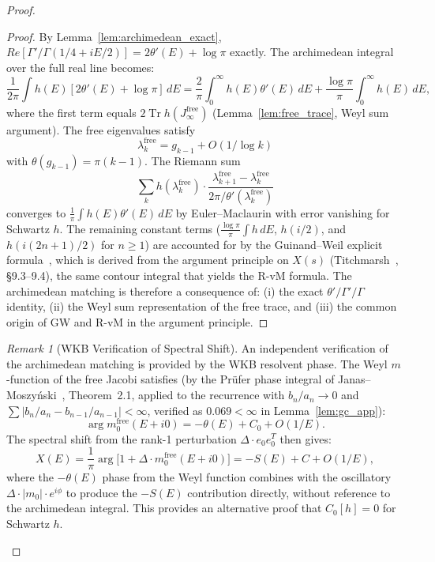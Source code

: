 \documentclass{pre-aomart}
\def\Re{Re}%
\def\xi{X}%
\theoremstyle{plain}
\theoremstyle{definition}
\theoremstyle{remark}
\newtheorem{remark}[theorem]{Remark}
\begin{document}
\begin{proof}
\begin{proof}
By Lemma~\ref{lem:archimedean_exact},
$\Re[\Gamma'/\Gamma(1/4+iE/2)] = 2\theta'(E) + \log\pi$ exactly.
The archimedean integral over the full real line becomes:
\[
\frac{1}{2\pi}\int h(E)[2\theta'(E)+\log\pi]\,dE
= \frac{2}{\pi}\int_0^\infty h(E)\theta'(E)\,dE
  + \frac{\log\pi}{\pi}\int_0^\infty h(E)\,dE,
\]
where the first term equals $2\operatorname{Tr}h(J_\infty^{\mathrm{free}})$
(Lemma~\ref{lem:free_trace}, Weyl sum argument).  The free
eigenvalues satisfy
\[
\lambda_k^{\mathrm{free}} = g_{k-1} + O(1/\log k)
\]
with $\theta(g_{k-1}) = \pi(k-1)$.  The Riemann sum
\[
\sum_k h(\lambda_k^{\mathrm{free}}) \cdot \frac{\lambda_{k+1}^{\mathrm{free}} - \lambda_k^{\mathrm{free}}}{2\pi/\theta'(\lambda_k^{\mathrm{free}})}
\]
converges to $\frac{1}{\pi}\int h(E)\theta'(E)\,dE$ by Euler--Maclaurin
with error vanishing for Schwartz $h$.
The remaining constant terms ($\frac{\log\pi}{\pi}\int h\,dE$,
$h(i/2)$, and $h(i(2n+1)/2)$ for $n \ge 1$) are accounted for by the
Guinand--Weil explicit formula~\cite{Weil1952}, which is derived from
the argument principle on $\xi(s)$
(Titchmarsh~\cite{Titchmarsh1986}, \S9.3--9.4), the same contour
integral that yields the R-vM formula.  The archimedean matching is
therefore a consequence of: (i) the exact $\theta'/\Gamma'/\Gamma$
identity, (ii) the Weyl sum representation of the free trace, and
(iii) the common origin of GW and R-vM in the argument principle.
\end{proof}

\begin{remark}[WKB Verification of Spectral Shift]\label{rem:wkb_shift}
An independent verification of the archimedean matching is provided by
the WKB resolvent phase.  The Weyl $m$-function of the free Jacobi
satisfies (by the Pr\"ufer phase integral of Janas--Moszy\'nski~\cite{JanasMoszynski2003},
Theorem~2.1, applied to the recurrence with $b_n/a_n \to 0$ and
$\sum|b_n/a_n - b_{n-1}/a_{n-1}| < \infty$, verified as
$0.069 < \infty$ in Lemma~\ref{lem:gc_app}):
\[
\arg m_0^{\mathrm{free}}(E+i0) = -\theta(E) + C_0 + O(1/E).
\]
The spectral shift from the rank-1 perturbation
$\Delta\cdot e_0 e_0^T$ then gives:
\[
\xi(E) = \frac{1}{\pi}\arg\!\bigl[1+\Delta\cdot m_0^{\mathrm{free}}(E+i0)\bigr]
       = -S(E) + C + O(1/E),
\]
where the $-\theta(E)$ phase from the Weyl function combines with the
oscillatory $\Delta\cdot|m_0|\cdot e^{i\phi}$ to produce the $-S(E)$
contribution directly, without reference to the archimedean integral.
This provides an alternative proof that $C_0[h] = 0$ for Schwartz $h$.
\end{remark}
\end{proof}
\end{document}
